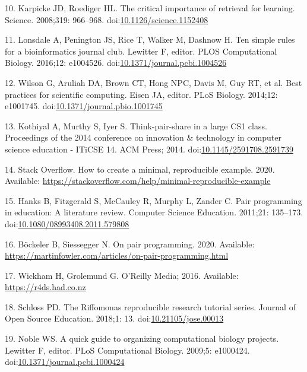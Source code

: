 \documentclass[
  11pt,
]{article}
\begin{document}
\leavevmode\hypertarget{ref-Karpicke2008}{}%
10. Karpicke JD, Roediger HL. The critical importance of retrieval for
learning. Science. 2008;319: 966--968.
doi:\href{https://doi.org/10.1126/science.1152408}{10.1126/science.1152408}

\leavevmode\hypertarget{ref-Lonsdale2016}{}%
11. Lonsdale A, Penington JS, Rice T, Walker M, Dashnow H. Ten simple
rules for a bioinformatics journal club. Lewitter F, editor. PLOS
Computational Biology. 2016;12: e1004526.
doi:\href{https://doi.org/10.1371/journal.pcbi.1004526}{10.1371/journal.pcbi.1004526}

\leavevmode\hypertarget{ref-Wilson2014}{}%
12. Wilson G, Aruliah DA, Brown CT, Hong NPC, Davis M, Guy RT, et al.
Best practices for scientific computing. Eisen JA, editor. PLoS Biology.
2014;12: e1001745.
doi:\href{https://doi.org/10.1371/journal.pbio.1001745}{10.1371/journal.pbio.1001745}

\leavevmode\hypertarget{ref-Kothiyal2014}{}%
13. Kothiyal A, Murthy S, Iyer S. Think-pair-share in a large CS1 class.
Proceedings of the 2014 conference on innovation \& technology in
computer science education - ITiCSE 14. ACM Press; 2014.
doi:\href{https://doi.org/10.1145/2591708.2591739}{10.1145/2591708.2591739}

\leavevmode\hypertarget{ref-StackOverflow_MREE}{}%
14. Stack Overflow. How to create a minimal, reproducible example. 2020.
Available:
\url{https://stackoverflow.com/help/minimal-reproducible-example}

\leavevmode\hypertarget{ref-Hanks2011}{}%
15. Hanks B, Fitzgerald S, McCauley R, Murphy L, Zander C. Pair
programming in education: A literature review. Computer Science
Education. 2011;21: 135--173.
doi:\href{https://doi.org/10.1080/08993408.2011.579808}{10.1080/08993408.2011.579808}

\leavevmode\hypertarget{ref-Bockeler_2020}{}%
16. Böckeler B, Siessegger N. On pair programming. 2020. Available:
\url{https://martinfowler.com/articles/on-pair-programming.html}

\leavevmode\hypertarget{ref-Wickham_2016}{}%
17. Wickham H, Grolemund G. O'Reilly Media; 2016. Available:
\url{https://r4ds.had.co.nz}

\leavevmode\hypertarget{ref-Schloss_2018}{}%
18. Schloss PD. The Riffomonas reproducible research tutorial series.
Journal of Open Source Education. 2018;1: 13.
doi:\href{https://doi.org/10.21105/jose.00013}{10.21105/jose.00013}

\leavevmode\hypertarget{ref-Noble2009}{}%
19. Noble WS. A quick guide to organizing computational biology
projects. Lewitter F, editor. PLoS Computational Biology. 2009;5:
e1000424.
doi:\href{https://doi.org/10.1371/journal.pcbi.1000424}{10.1371/journal.pcbi.1000424}
\end{document}
